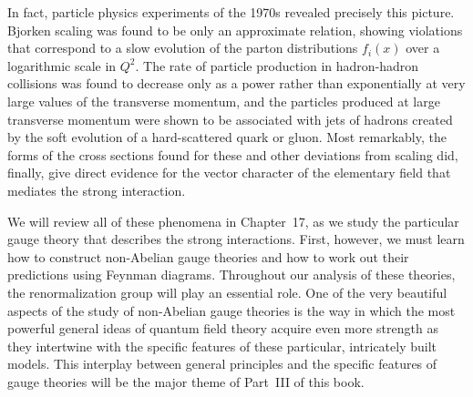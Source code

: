 In fact, particle physics experiments of the 1970s revealed precisely this
picture.  Bjorken scaling was found to be only an approximate relation,
showing violations that correspond to a slow evolution of the parton
distributions $f_i(x)$ over a logarithmic scale in $Q^2$.  The rate of
particle production in hadron-hadron collisions was found to decrease only as
a power rather than exponentially at very large values of the transverse
momentum, and the particles produced at large transverse momentum were shown
to be associated with jets of hadrons created by the soft evolution of a
hard-scattered quark or gluon.  Most remarkably, the forms of the cross
sections found for these and other deviations from scaling did, finally, give
direct evidence for the vector character of the elementary field that
mediates the strong interaction.

We will review all of these phenomena in Chapter~17, as we study the
particular gauge theory that describes the strong interactions.  First,
however, we must learn how to construct non-Abelian gauge theories and how to
work out their predictions using Feynman diagrams.  Throughout our analysis
of these theories, the renormalization group will play an essential role.  One
of the very beautiful aspects of the study of non-Abelian gauge theories is
the way in which the most powerful general ideas of quantum field theory
acquire even more strength as they intertwine with the specific features of
these particular, intricately built models.  This interplay between general
principles and the specific features of gauge theories will be the major
theme of Part~III of this book.
